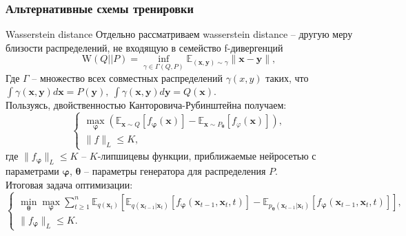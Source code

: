 \documentclass[8pt]{beamer}
\begin{document}
\begin{frame}
\frametitle{Альтернативные схемы тренировки}
	\begin{block}{Wasserstein distance}
		Отдельно рассматриваем wasserstein distance -- другую меру близости распределений, не входящую в семейство f-дивергенций
		\begin{equation*}
			\text{W}(Q||P) = \inf\limits_{\gamma \in \Gamma(Q,P)} \mathbb{E}_{(\textbf{x},\textbf{y})\sim \gamma} \|\textbf{x}-\textbf{y}\|,
		\end{equation*}
		Где $\Gamma$ -- множество всех совместных распределений  $\gamma(x,y)$ таких, что $\int \gamma(\textbf{x},\textbf{y}) d\textbf{x} = P(\textbf{y}),~\int \gamma(\textbf{x},\textbf{y}) d\textbf{y} = Q(\textbf{x})$.\\
		\smallskip
		Пользуясь, двойственностью Канторовича-Рубинштейна получаем:		
		\begin{equation*}
			\begin{cases}
				\max\limits_{\boldsymbol{\varphi}}\left(\mathbb{E}_{\textbf{x}\sim Q} [f_{\boldsymbol{\varphi}}(\textbf{x})] - \mathbb{E}_{\textbf{x}\sim P_{\boldsymbol{\theta}}} [f_\varphi(\textbf{x})]\right),\\
				\|f\|_L \leqslant K,
			\end{cases}
		\end{equation*}
		где $\|f_{\boldsymbol{\varphi}}\|_L\leqslant K$ -- $K$-липшицевы функции, приближаемые нейросетью с параметрами ${\boldsymbol{\varphi}}$,
	    ${\boldsymbol{\theta}}$ -- параметры генератора для распределения $P$.\\ 
		\smallskip
		Итоговая задача оптимизации:
		\begin{equation*}
			\begin{cases}
				\min\limits_{\boldsymbol{\theta}}\max\limits_{\boldsymbol{\varphi}}\sum\limits_{t\geqslant 1}^n \mathbb{E}_{q(\textbf{x}_t)}\left[\mathbb{E}_{q(\textbf{x}_{t-1}|\textbf{x}_t)}\left[f_{\boldsymbol{\varphi}}(\textbf{x}_{t-1}, \textbf{x}_t, t)\right] - \mathbb{E}_{p_{\boldsymbol{\theta}}(\textbf{x}_{t-1}|\textbf{x}_t)}\left[f_{\boldsymbol{\varphi}}(\textbf{x}_{t-1}, \textbf{x}_t, t)\right]\right],\\
				\|f_{\boldsymbol{\varphi}}\|_L \leqslant K.
			\end{cases}
		\end{equation*}
	\end{block}
\end{frame}
\end{document}
